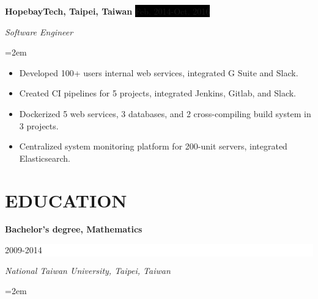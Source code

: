 \documentclass[a4paper, 11pt]{article}
\newcommand{\sepspace}{\vspace*{1em}}		%
\newcommand{\NewPart}[1]{\section*{\uppercase{#1}}}
\newcommand{\EducationEntry}[4]{
		\noindent \textbf{#1} \hfill      %
		\colorbox{White}{%
			\parbox{5cm}{%
			\hfill\color{Black}#2}} \par  %
		\noindent \textit{#3} \par        %
		\noindent\hangindent=2em\hangafter=0 \small #4 %
		\normalsize \par}
\newcommand{\WorkEntry}[4]{				  %
		\noindent \textbf{#1} \hfill      %
		\noindent\colorbox{Black}{\color{White}#2} \par  %
		\noindent \textit{#3} \par              %
		\noindent\hangindent=2em\hangafter=0 \small #4 %
		\normalsize \par}
\begin{document}
\sepspace

\WorkEntry{HopebayTech, Taipei, Taiwan}{Feb. 2014-Oct. 2016}{Software Engineer}{
\begin{itemize}
	\item {Developed 100+ users internal web services, integrated G Suite and Slack.}
	\item {Created CI pipelines for 5 projects, integrated Jenkins, Gitlab, and Slack.}
	\item {Dockerized 5 web services, 3 databases, and 2 cross-compiling build system in 3 projects.}
	\item {Centralized system monitoring platform for 200-unit servers, integrated Elasticsearch.}
\end{itemize}
}

\NewPart{Education}{}

\EducationEntry{Bachelor's degree, Mathematics}{2009-2014}
{National Taiwan University, Taipei, Taiwan}{}


\end{document}
